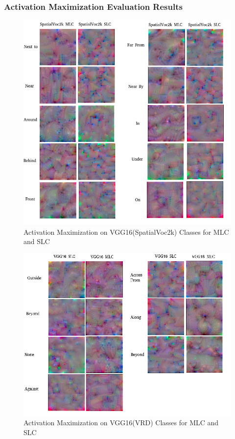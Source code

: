 \documentclass{csfyp}
\begin{document}
\subsubsection{Activation Maximization Evaluation Results}
\newpage
\begin{figure}[!htbp]
	\includegraphics[scale=0.60,center]{Spatial_act.pdf}
	\caption{Activation Maximization on VGG16(SpatialVoc2k) Classes for MLC and SLC}
\end{figure}
\begin{figure}[!htbp]
	\includegraphics[scale=0.60,center]{VGG16_Spatial2.pdf}
	\caption{Activation Maximization on VGG16(VRD) Classes for MLC and SLC}
\end{figure}
\end{document}
